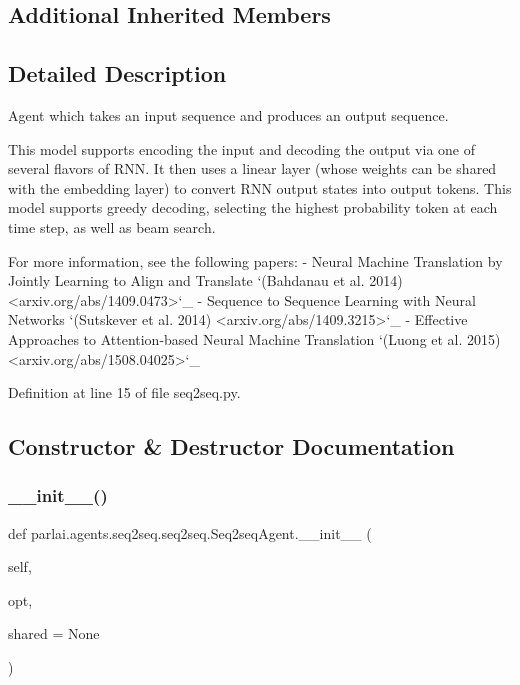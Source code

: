 \subsection*{Additional Inherited Members}


\subsection{Detailed Description}
\begin{DoxyVerb}Agent which takes an input sequence and produces an output sequence.

This model supports encoding the input and decoding the output via one of
several flavors of RNN. It then uses a linear layer (whose weights can
be shared with the embedding layer) to convert RNN output states into
output tokens. This model supports greedy decoding, selecting the
highest probability token at each time step, as well as beam
search.

For more information, see the following papers:
- Neural Machine Translation by Jointly Learning to Align and Translate
  `(Bahdanau et al. 2014) <arxiv.org/abs/1409.0473>`_
- Sequence to Sequence Learning with Neural Networks
  `(Sutskever et al. 2014) <arxiv.org/abs/1409.3215>`_
- Effective Approaches to Attention-based Neural Machine Translation
  `(Luong et al. 2015) <arxiv.org/abs/1508.04025>`_
\end{DoxyVerb}
 

Definition at line 15 of file seq2seq.\+py.



\subsection{Constructor \& Destructor Documentation}
\mbox{\label{classparlai_1_1agents_1_1seq2seq_1_1seq2seq_1_1Seq2seqAgent_a7d1af2d90ac02cd2c7401185c2d09c3e}} 
\subsubsection{\texorpdfstring{\+\_\+\+\_\+init\+\_\+\+\_\+()}{\_\_init\_\_()}}
{\footnotesize\ttfamily def parlai.\+agents.\+seq2seq.\+seq2seq.\+Seq2seq\+Agent.\+\_\+\+\_\+init\+\_\+\+\_\+ (\begin{DoxyParamCaption}\item[{}]{self,  }\item[{}]{opt,  }\item[{}]{shared = {\ttfamily None} }\end{DoxyParamCaption})}

